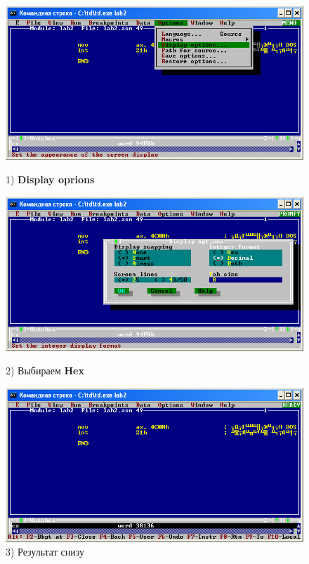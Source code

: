 \begin{figure}[!htp]
    \centering
    \begin{minipage}{0.32\textwidth}
        \centering
        \includegraphics[width=.99\linewidth]
            {../_INCLUDES/task-4-13-2/1.png}
        \caption{1) \textbf{Display oprions}}
        \label{fig:task_4_13_2__1}
    \end{minipage}
    \begin {minipage}{0.32\textwidth}
        \centering
        \includegraphics[width=.99\linewidth]
            {../_INCLUDES/task-4-13-2/2.png}
        \caption{2) Выбираем \textbf{Hex}}
        \label{fig:task_4_13_2__2}
    \end{minipage}
    \begin {minipage}{0.32\textwidth}
        \centering
        \includegraphics[width=.99\linewidth]
            {../_INCLUDES/task-4-13-2/3.png}
        \caption{3) Результат снизу}
        \label{fig:task_4_13_2__3}
    \end{minipage}
\end{figure}

